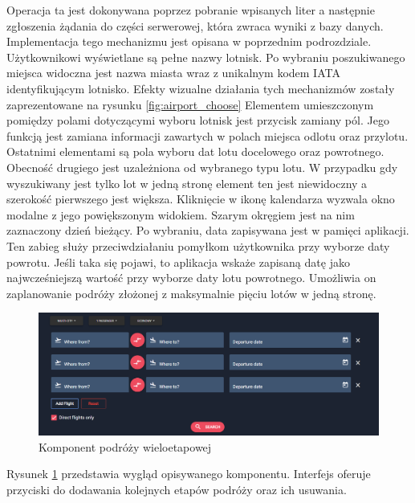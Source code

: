 \documentclass[12pt, twoside]{report}
\begin{document}
Operacja ta jest dokonywana poprzez pobranie wpisanych liter a następnie zgłoszenia żądania do części serwerowej, która zwraca wyniki z bazy danych. Implementacja tego mechanizmu jest opisana w poprzednim podrozdziale. Użytkownikowi wyświetlane są pełne nazwy lotnisk. Po wybraniu poszukiwanego miejsca widoczna jest nazwa miasta wraz z unikalnym kodem IATA identyfikującym lotnisko. Efekty wizualne działania tych mechanizmów zostały zaprezentowane na rysunku \ref{fig:airport_choose} Elementem umieszczonym pomiędzy polami dotyczącymi wyboru lotnisk jest przycisk zamiany pól. Jego funkcją jest zamiana informacji zawartych w polach miejsca odlotu oraz przylotu. Ostatnimi elementami są pola wyboru dat lotu docelowego oraz powrotnego. Obecność drugiego jest uzależniona od wybranego typu lotu. W przypadku gdy wyszukiwany jest tylko lot w jedną stronę element ten jest niewidoczny a szerokość pierwszego jest większa. Kliknięcie w ikonę kalendarza wyzwala okno modalne z jego powiększonym widokiem. Szarym okręgiem jest na nim zaznaczony dzień bieżący. Po wybraniu, data zapisywana jest w pamięci aplikacji. Ten zabieg służy przeciwdziałaniu pomyłkom użytkownika przy wyborze daty powrotu. Jeśli taka się pojawi, to aplikacja wskaże zapisaną datę jako najwcześniejszą wartość przy wyborze daty lotu powrotnego. Umożliwia on zaplanowanie podróży złożonej z maksymalnie pięciu lotów w jedną stronę. 
\begin{figure}[!ht]
\centering
\includegraphics[scale=0.40, keepaspectratio]{multi_panel.png}
\caption{Komponent podróży wieloetapowej}
\label{fig:multi_panel}
\end{figure}
Rysunek \ref{fig:multi_panel} przedstawia wygląd opisywanego komponentu. Interfejs oferuje przyciski do dodawania kolejnych etapów podróży oraz ich usuwania.  
\end{document}
